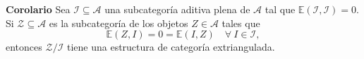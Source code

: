 \documentclass[preview]{standalone}
\begin{document}
\begin{center}
\justifying \textbf{Corolario} Sea $\mathscr{I}\subseteq\mathscr{A}$ una subcategoría aditiva plena de $\mathscr{A}$ tal que $\mathbb{E}(\mathscr{I}, \mathscr{I})=0$. Si $\mathscr{Z}\subseteq\mathscr{A}$ es la subcategoría de los objetos $Z\in\mathscr{A}$ tales que $$\mathbb{E}(Z,I) = 0 = \mathbb{E}(I,Z) \quad \forall \ I\in\mathscr{I},$$ entonces $\mathscr{Z}/\mathscr{I}$ tiene una estructura de categoría extriangulada.
\end{center}
\end{document}
